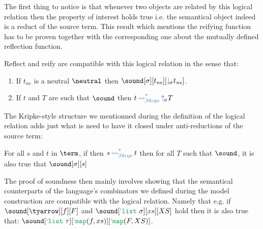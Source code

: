 The first thing to notice is that whenever two objects are related by this
logical relation then the property of interest holds true i.e. the semantical
object indeed is a reduct of the source term. This result which mentions the
reifying function has to be proven together with the corresponding one about
the mutually defined reflection function.

\begin{lemma}Reflect and reify are compatible with this logical relation in the
sense that:
\begin{enumerate}
  \item If $t_{\mathit{ne}}$ is a neutral $\neutral$ then $\sound[\sigma][t_{\mathit{ne}}][\reflect t_{\mathit{ne}}]$.
  \item If $t$ and $T$ are such that $\sound$ then $t \reduces \reify T$
\end{enumerate}
\end{lemma}

The Kripke-style structure we mentionned during the definition of the logical
relation adds just what is need to have it closed under anti-reductions of the
source term:
\begin{proposition}For all $s$ and $t$ in $\term$, if then $s \reduces t$ then
for all $T$ such that $\sound$, it is also true that $\sound[\sigma][s]$
\end{proposition}

The proof of soundness then mainly involves showing that the semantical counterparts
of the language's combinators we defined during the model construction are compatible
with the logical relation. Namely that e.g. if $\sound[\tyarrow][f][F]$ and
$\sound[\tylist][xs][XS]$ hold then it is also true that:
$\sound[\protect{\tylist[\tau]}][\temap(f ,xs)][\temap(F , XS)]$.

